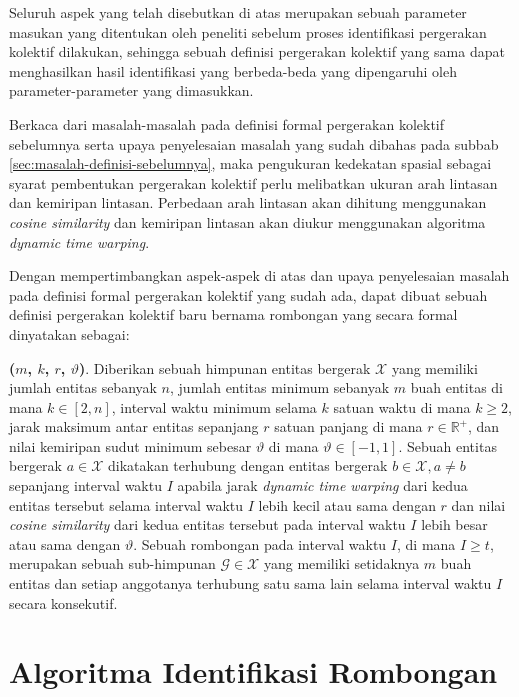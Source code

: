 Seluruh aspek yang telah disebutkan di atas merupakan sebuah parameter masukan yang ditentukan oleh peneliti sebelum proses identifikasi pergerakan kolektif dilakukan, sehingga sebuah definisi pergerakan kolektif yang sama dapat menghasilkan hasil identifikasi yang berbeda-beda yang dipengaruhi oleh parameter-parameter yang dimasukkan.

Berkaca dari masalah-masalah pada definisi formal pergerakan kolektif sebelumnya serta upaya penyelesaian masalah yang sudah dibahas pada subbab \ref{sec:masalah-definisi-sebelumnya}, maka pengukuran kedekatan spasial sebagai syarat pembentukan pergerakan kolektif perlu melibatkan ukuran arah lintasan dan kemiripan lintasan. Perbedaan arah lintasan akan dihitung menggunakan \textit{cosine similarity} dan kemiripan lintasan akan diukur menggunakan algoritma \textit{dynamic time warping}.

Dengan mempertimbangkan aspek-aspek di atas dan upaya penyelesaian masalah pada definisi formal pergerakan kolektif yang sudah ada, dapat dibuat sebuah definisi pergerakan kolektif baru bernama rombongan yang secara formal dinyatakan sebagai:

\noindent \textbf{\pergerakankolektif($m$, $k$, $r$, $\vartheta$)}. Diberikan sebuah himpunan entitas bergerak $\mathcal{X}$ yang memiliki jumlah entitas sebanyak $n$, jumlah entitas minimum sebanyak $m$ buah entitas di mana $k \in [2, n]$, interval waktu minimum selama $k$ satuan waktu di mana $k \geq 2$, jarak maksimum antar entitas sepanjang $r$ satuan panjang di mana $r \in \mathbb{R}^+$, dan nilai kemiripan sudut minimum sebesar $\vartheta$ di mana $\vartheta \in [-1, 1]$. Sebuah entitas bergerak $a \in \mathcal{X}$ dikatakan terhubung dengan entitas bergerak $b \in \mathcal{X}, a \neq b$ sepanjang interval waktu $I$ apabila jarak \textit{dynamic time warping} dari kedua entitas tersebut selama interval waktu $I$ lebih kecil atau sama dengan $r$ dan nilai \textit{cosine similarity} dari kedua entitas tersebut pada interval waktu $I$ lebih besar atau sama dengan $\vartheta$. Sebuah rombongan pada interval waktu $I$, di mana $I \geq t$, merupakan sebuah sub-himpunan $\mathcal{G} \in \mathcal{X}$ yang memiliki setidaknya $m$ buah entitas dan setiap anggotanya terhubung satu sama lain selama interval waktu $I$ secara konsekutif.

\section{Algoritma Identifikasi Rombongan}
\label{sec:algoritma}
    
